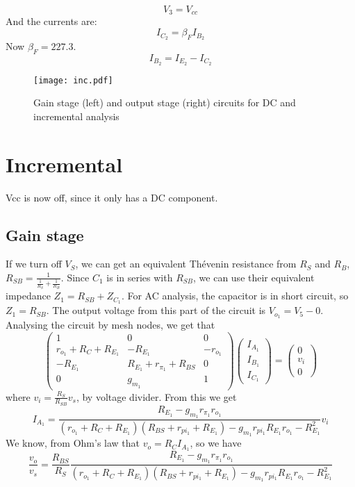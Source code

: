 \begin{equation} 
V_3=V_{cc}
\end{equation}
And the currents are:
\begin{equation}
    I_{C_2}=\beta_F I_{B_2}
\end{equation}
Now $\beta_F=227.3$.
\begin{equation}
    I_{B_2}=I_{E_2}-I_{C_2}
\end{equation}
\begin{figure}[H] \centering
\texttt{[image: inc.pdf]}
\caption{Gain stage (left) and output stage (right) circuits for DC and incremental analysis}
\label{fig:oc2}
\end{figure} 
\section{Incremental}
Vcc is now off, since it only has a DC component.
\subsection{Gain stage}
If we turn off $V_S$, we can get an equivalent Thévenin resistance from $R_S$ and $R_B$, $R_{SB}=\frac{1}{\frac{1}{R_S}+\frac{1}{R_B}}$. Since $C_1$ is in series with $R_{SB}$, we can use their equivalent impedance $Z_1=R_{SB}+Z_{C_1}$. For AC analysis, the capacitor is in short circuit, so $Z_1=R_{SB}$.  The output voltage from this part of the circuit is $V_{o_1}=V_5-0$. Analysing the circuit by mesh nodes, we get that 
\begin{equation}
\left(\begin{array}{ccccc} 1 & 0 & 0 \\ r_{o_1}+R_C+R_{E_1} & -R_{E_1} & -r_{o_1}\\
-R_{E_1} & R_{E_1}+r_{\pi_1}+R_{BS} & 0\\ 0 & g_{m_1} & 1
\end{array}\right)
\left(\begin{array}{c} I_{A_1} \\ I_{B_1} \\ I_{C_1}  \end{array}\right) 
= \left(\begin{array}{c}  0 \\ v_i \\0 \end{array}\right)
\end{equation}
where $v_i=\frac{R_S}{R_{SB}}v_s$, by voltage divider.
From this we get
\begin{equation}
    I_{A_1}=\frac{R_{E_1}-g_{m_1}r_{\pi_1} r_{o_1}}{(r_{o_1}+R_C+R_{E_1})(R_{BS}+r_{pi_1}+R_{E_1})-g_{m_1}r_{pi_1}R_{E_1}r_{o_1}-R_{E_1}^2}v_i
\end{equation}
We know, from Ohm's law that $v_o=R_C I_{A_1}$, so we have
\begin{equation}
    \frac{v_o}{v_s}=\frac{R_{BS}}{R_S}\frac{R_{E_1}-g_{m_1}r_{\pi_1} r_{o_1}}{(r_{o_1}+R_C+R_{E_1})(R_{BS}+r_{pi_1}+R_{E_1})-g_{m_1}r_{pi_1}R_{E_1}r_{o_1}-R_{E_1}^2}
\end{equation}


